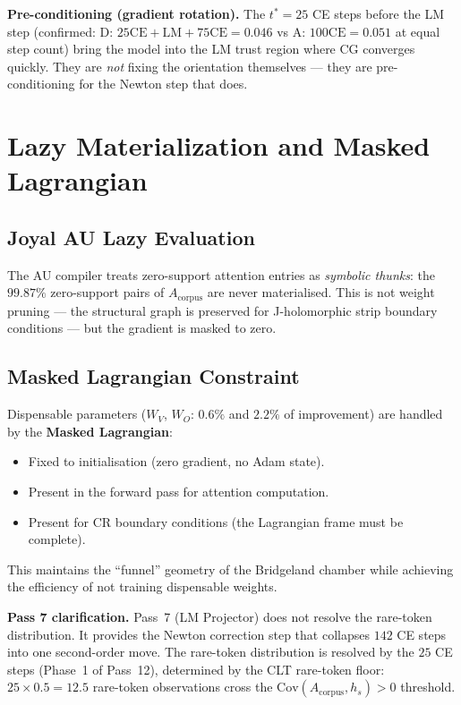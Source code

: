 \documentclass[11pt]{amsart}
\begin{document}
\textbf{Pre-conditioning (gradient rotation).}
The $t^*=25$ CE steps before the LM step
(confirmed: D: $25\text{CE}+\text{LM}+75\text{CE} = 0.046$ vs
A: $100\text{CE} = 0.051$ at equal step count)
bring the model into the LM trust region where CG converges quickly.
They are \emph{not} fixing the orientation themselves ---
they are pre-conditioning for the Newton step that does.

\section{Lazy Materialization and Masked Lagrangian}
\label{sec:lazy}

\subsection{Joyal AU Lazy Evaluation}

The AU compiler treats zero-support attention entries as \emph{symbolic thunks}:
the $99.87\%$ zero-support pairs of $A_\mathrm{corpus}$ are never materialised.
This is not weight pruning --- the structural graph is preserved for
J-holomorphic strip boundary conditions --- but the gradient is masked to zero.

\subsection{Masked Lagrangian Constraint}

Dispensable parameters ($W_V$, $W_O$: $0.6\%$ and $2.2\%$ of improvement)
are handled by the \textbf{Masked Lagrangian}:
\begin{itemize}
\item Fixed to initialisation (zero gradient, no Adam state).
\item Present in the forward pass for attention computation.
\item Present for CR boundary conditions (the Lagrangian frame must be complete).
\end{itemize}
This maintains the ``funnel'' geometry of the Bridgeland chamber
while achieving the efficiency of not training dispensable weights.

\textbf{Pass 7 clarification.}
Pass~7 (LM Projector) does not resolve the rare-token distribution.
It provides the Newton correction step that collapses $142$ CE steps
into one second-order move.
The rare-token distribution is resolved by the $25$ CE steps (Phase~1
of Pass~12), determined by the CLT rare-token floor:
$25 \times 0.5 = 12.5$ rare-token observations cross the
$\mathrm{Cov}(A_\mathrm{corpus},h_s) > 0$ threshold.
\end{document}
